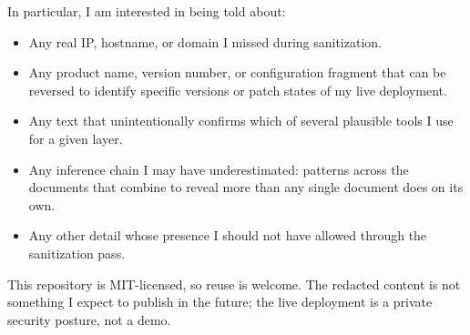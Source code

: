 \documentclass[12pt]{article}
\begin{document}
In particular, I am interested in being told about:

\begin{itemize}[leftmargin=18pt,itemsep=2pt]
  \item Any real IP, hostname, or domain I missed during sanitization.
  \item Any product name, version number, or configuration fragment that can be reversed to identify specific versions or patch states of my live deployment.
  \item Any text that unintentionally confirms which of several plausible tools I use for a given layer.
  \item Any inference chain I may have underestimated: patterns across the documents that combine to reveal more than any single document does on its own.
  \item Any other detail whose presence I should not have allowed through the sanitization pass.
\end{itemize}

This repository is MIT-licensed, so reuse is welcome. The redacted content is not something I expect to publish in the future; the live deployment is a private security posture, not a demo.
\end{document}
